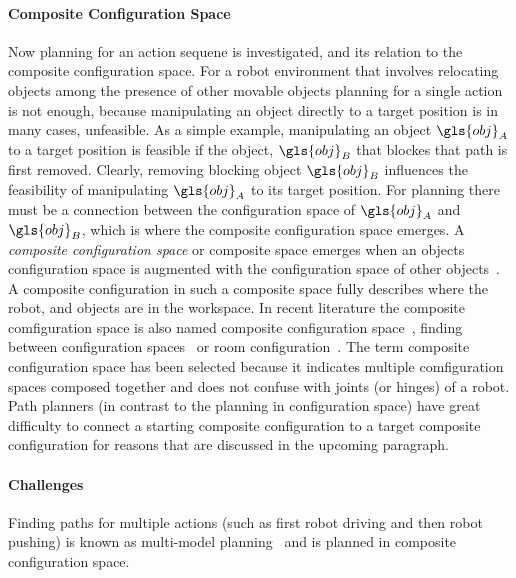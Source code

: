 \paragraph{Composite Configuration Space}
Now planning for an action sequene is investigated, and its relation to the composite configuration space. For a robot environment that involves relocating objects among the presence of other movable objects planning for a single action is not enough, because manipulating an object directly to a target position is in many cases, unfeasible. As a simple example, manipulating an object $\gls{obj}_A$ to a target position is feasible if the object, $\gls{obj}_B$ that blockes that path is first removed. Clearly, removing blocking object $\gls{obj}_B$ influences the feasibility of manipulating $\gls{obj}_A$ to its target position. For planning there must be a connection between the configuration space of $\gls{obj}_A$ and $\gls{obj}_B$, which is where the composite configuration space emerges. A \textit{composite configuration space} or composite space emerges when an objects configuration space is augmented with the configuration space of other objects~\cite{vandenberg_path_2009}. A composite configuration in such a composite space fully describes where the robot, and objects are in the workspace. In recent literature the composite comfiguration space is also named composite configuration space~\cite{vega-brown_asymptotically_2020}, finding  between configuration spaces~\cite{hauser_multimodal_2010} or room configuration~\cite{sabbaghnovin_model_2021}. The term composite configuration space has been selected because it indicates multiple comfiguration spaces composed together and does not confuse with joints (or hinges) of a robot. Path planners (in contrast to the planning in configuration space) have great difficulty to connect a starting composite configuration to a target composite configuration for reasons that are discussed in the upcoming paragraph.\bs

\paragraph{Challenges}

Finding paths for multiple actions (such as first robot driving and then robot pushing) is known as multi-model planning~\cite{hauser_multimodal_2010} and is planned in composite configuration space. 


